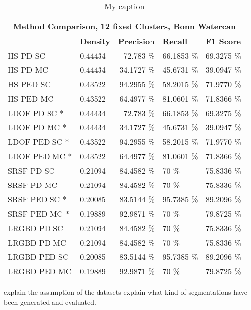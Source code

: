 \begin{table}[]
\centering
\begin{tabular}{|l|l|r|l|l|}
\hline
\multicolumn{5}{|c|}{Method Comparison, 12 fixed Clusters, Bonn Watercan}                        \\ \hline
              & \textbf{Density} & \textbf{Precision} & \textbf{Recall} & \textbf{F1 Score} \\ \hline
HS PD SC & 0.44434 & 72.783 \%   & 66.1853 \%     & 69.3275 \%  \\ \hline
HS PD MC & 0.44434 & 34.1727 \%   & 45.6731 \%     & 39.0947 \%  \\ \hline              
HS PED SC & 0.43522 & 94.2955 \%   & 58.2015 \%     & 71.9770 \%  \\ \hline
HS PED MC & 0.43522 & 64.4977 \%   & 81.0601 \%     & 71.8366 \%  \\ \hline            
LDOF PD SC * & 0.44434 & 72.783 \%   & 66.1853 \%     & 69.3275 \%  \\ \hline
LDOF PD MC * & 0.44434 & 34.1727 \%   & 45.6731 \%     & 39.0947 \%  \\ \hline              
LDOF PED SC * & 0.43522 & 94.2955 \%   & 58.2015 \%     & 71.9770 \%  \\ \hline
LDOF PED MC * & 0.43522 & 64.4977 \%   & 81.0601 \%     & 71.8366 \%  \\ \hline
SRSF PD SC & 0.21094 & 84.4582 \%   & 70 \%     & 75.8336 \%  \\ \hline
SRSF PD MC & 0.21094 & 84.4582 \%   & 70 \%     & 75.8336 \%  \\ \hline
SRSF PED SC * & 0.20085 & 83.5144 \%   & 95.7385 \%     & 89.2096 \%  \\ \hline
SRSF PED MC * & 0.19889 & 92.9871 \%   & 70 \%     & 79.8725 \%  \\ \hline
LRGBD PD SC & 0.21094 & 84.4582 \%   & 70 \%     & 75.8336 \%  \\ \hline
LRGBD PD MC & 0.21094 & 84.4582 \%   & 70 \%     & 75.8336 \%  \\ \hline
LRGBD PED SC & 0.20085 & 83.5144 \%   & 95.7385 \%     & 89.2096 \%  \\ \hline
LRGBD PED MC & 0.19889 & 92.9871 \%   & 70 \%     & 79.8725 \%  \\ \hline
\end{tabular}
\caption[Method Comparission Bonn Watercan]{My caption}
\label{tab:bonn_wc_methods}
\end{table}


explain the assumption of the datasets
explain what kind of segmentations have been generated and evaluated.







